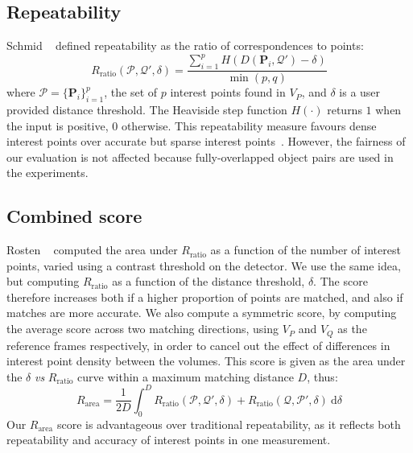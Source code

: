 \subsection{Repeatability}
Schmid \etal~\cite{Schmid2000} defined repeatability as the ratio of correspondences to points:
\begin{equation}
R_\textrm{ratio}(\mathcal{P}, \mathcal{Q}', \delta) = \frac{\sum_{i=1}^p H(D(\mathbf{P}_i, \mathcal{Q}') - \delta)}{\min(p, q)}
\label{eq:repeatratio}
\end{equation}
where $\mathcal{P} = \{\mathbf{P}_i\}_{i=1}^{p}$, the set of $p$ interest points found in $V_P$, and $\delta$ is a user provided distance threshold. 
The Heaviside step function $H(\cdot)$ returns $1$ when the input is positive, $0$ otherwise.
This repeatability measure favours dense interest points over accurate but sparse interest points~\cite{Willis2009}. 
However, the fairness of our evaluation is not affected because fully-overlapped object pairs are used in the experiments.

\subsection{Combined score}
Rosten \etal~\cite{Rosten2010} computed the area under $R_\textrm{ratio}$ as a function of the number of interest points, varied using a contrast threshold on the detector. We use the same idea, but computing $R_\textrm{ratio}$ as a function of the distance threshold, $\delta$. The score therefore increases both if a higher proportion of points are matched, and also if matches are more accurate. We also compute a symmetric score, by computing the average score across two matching directions, using $V_P$ and $V_Q$ as the reference frames respectively, in order to  cancel out the effect of differences in interest point density between the volumes. This score is given as the area under the $\delta$ \emph{vs} $R_\textrm{ratio}$ curve within a maximum matching distance $D$, thus:
\begin{equation}
R_\textrm{area}=\frac{1}{2D}\int_{0}^{D}R_\textrm{ratio}(\mathcal{P}, \mathcal{Q}', \delta) + R_\textrm{ratio}(\mathcal{Q}, \mathcal{P}', \delta) ~ \textrm{d}\delta
\label{eq:rptarea}
\end{equation}
Our $R_{\textrm{area}}$ score is advantageous over traditional repeatability, as it reflects both repeatability and accuracy of interest points in one measurement. 



